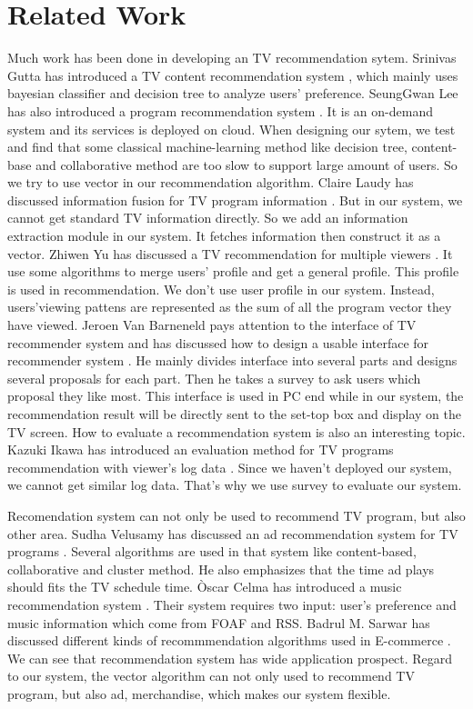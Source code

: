 \section{Related Work}
\label{sec:relate}
Much work has been done in developing an TV recommendation
sytem.
Srinivas Gutta has introduced a TV content recommendation
system
\cite{Gutta00:ContentRecommender}, which mainly uses
bayesian classifier and decision tree to analyze users'
preference. SeungGwan Lee has also introduced a program
recommendation system
\cite{Lee10:RecommendunderCloud}. It is an on-demand
system and its services is deployed on cloud. When
designing our sytem,
we test and find that some classical machine-learning
method like decision tree, content-base and collaborative
method are too slow to support large amount of users.
So we try to use vector in our recommendation algorithm.
Claire Laudy has discussed information fusion for TV program
information
\cite{Laudy08:InfoFusion}. But in our system, we cannot get
standard TV information directly. So we add an information
extraction module in our system. It fetches information then
construct it as a vector. Zhiwen Yu has discussed a TV
recommendation for multiple viewers
\cite{Zhiwen06:RecommendMultiViewers}.
It use some algorithms to merge users' profile and get a
general profile. This profile is used in recommendation. We
don't use user profile in our system. Instead, users'viewing
pattens are represented as the
sum of all the program vector they have viewed. Jeroen Van
Barneneld pays attention to the interface of TV recommender
system and has discussed how to design a usable interface
for recommender system
\cite{Barneveld04:Interface}.
He mainly divides interface into several parts and designs
several proposals for each part. Then he takes a survey
to ask users which proposal they like most. This interface
is used in PC end while in our system, the recommendation
result will be directly sent to the set-top box and display
on the TV screen. How to evaluate a recommendation
system is also an interesting topic. Kazuki Ikawa has
introduced an evaluation method for TV programs
recommendation with viewer's log data
\cite{Ikawa10:Evaluate}.
Since we haven't deployed our system, we cannot get similar
log data. That's why we use survey to evaluate our system.

Recomendation system can not only be
used to recommend TV program, but also other area.
Sudha Velusamy has discussed an ad recommendation system
for TV programs
\cite{Velusamy08:AdRecommend}.
Several algorithms are used in that system
like content-based, collaborative and cluster method. He
also emphasizes that the time ad plays should fits the
TV schedule time. {\`O}scar Celma has introduced a music
recommendation system
\cite{CelmaRH05:MusicRecommend}.
Their system requires two input: user's preference and music
information which come from FOAF and RSS. Badrul M. Sarwar
has discussed different kinds of recommmendation algorithms
used in E-commerce
\cite{Sarwar00:ECommerceRecommend}. We can see that
recommendation system has wide application prospect.
Regard to our system, the vector algorithm can not only
used to recommend TV program, but also ad, merchandise,
which makes our system flexible.


